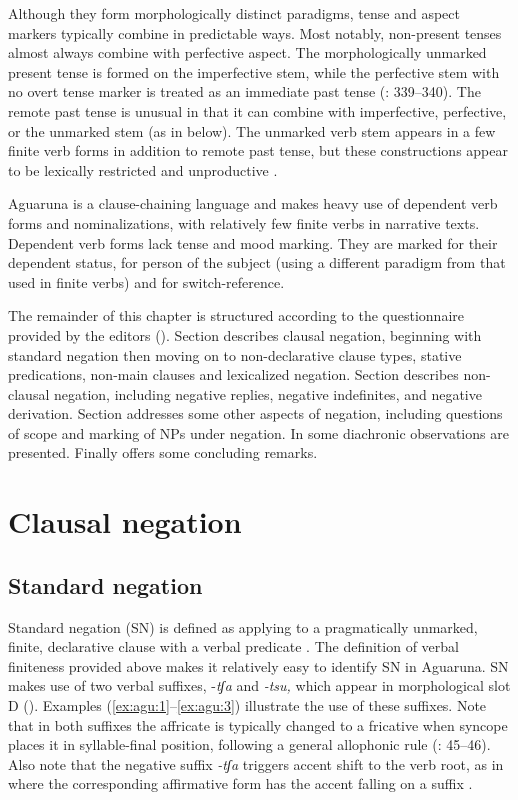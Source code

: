 \documentclass[output=paper,colorlinks,citecolor=brown,draft]{langscibook}
\begin{document}
Although they form morphologically distinct paradigms, tense and aspect markers typically combine in predictable ways. Most notably, non-present tenses almost always combine with perfective aspect. The morphologically unmarked present tense is formed on the imperfective stem, while the perfective stem with no overt tense marker is treated as an immediate past tense (\citealt{Overall2017a}: 339–340). The remote past tense is unusual in that it can combine with imperfective, perfective, or the unmarked stem (as in  below). The unmarked verb stem appears in a few finite verb forms in addition to remote past tense, but these constructions appear to be lexically restricted and unproductive \citep[253]{Overall2017a}.

Aguaruna is a clause-chaining language and makes heavy use of dependent verb forms and nominalizations, with relatively few finite verbs in narrative texts. Dependent verb forms lack tense and mood marking. They are marked for their dependent status, for person of the subject (using a different paradigm from that used in finite verbs) and for switch-reference. 

The remainder of this chapter is structured according to the questionnaire provided by the editors (). Section  describes clausal negation, beginning with standard negation then moving on to non-declarative clause types, stative predications, non-main clauses and lexicalized negation. Section  describes non-clausal negation, including negative replies, negative indefinites, and negative derivation. Section  addresses some other aspects of negation, including questions of scope and marking of NPs under negation. In  some diachronic observations are presented. Finally  offers some concluding remarks.

\section{Clausal negation}\label{sec:agu:2}
\subsection{Standard negation}\label{sec:agu:2.1}

Standard negation (SN) is defined as applying to a pragmatically unmarked, finite, declarative clause with a verbal predicate \citep{Payne1985,Miestamo2005,Miestamo2017}. The definition of verbal finiteness provided above makes it relatively easy to identify SN in Aguaruna. SN makes use of two verbal suffixes, \nobreakdash-\textit{tʃa} and \textit{\nobreakdash-tsu,} which appear in morphological slot D (). Examples (\ref{ex:agu:1}--\ref{ex:agu:3}) illustrate the use of these suffixes. Note that in both suffixes the affricate is typically changed to a fricative when syncope places it in syllable-final position, following a general allophonic rule (\citealt{Overall2017a}: 45–46). Also note that the negative suffix \textit{{}-tʃa} triggers accent shift to the verb root, as in  where the corresponding affirmative form has the accent falling on a suffix  \citep[113]{Overall2017a}.
\end{document}
